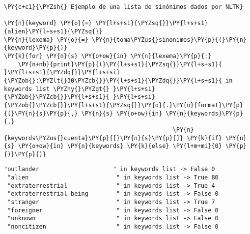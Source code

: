     \begin{tcolorbox}[breakable, size=fbox, boxrule=1pt, pad at break*=1mm,colback=cellbackground, colframe=cellborder]
\begin{Verbatim}[commandchars=\\\{\}]
\PY{c+c1}{\PYZsh{} Ejemplo de una lista de sinónimos dados por NLTK}

\PY{n}{keyword} \PY{o}{=} \PY{l+s+s1}{\PYZsq{}}\PY{l+s+s1}{alien}\PY{l+s+s1}{\PYZsq{}}
\PY{n}{lexema} \PY{o}{=} \PY{n}{toma\PYZus{}sinonimos}\PY{p}{(}\PY{n}{keyword}\PY{p}{)}
\PY{k}{for} \PY{n}{s} \PY{o+ow}{in} \PY{n}{lexema}\PY{p}{:}
    \PY{n+nb}{print}\PY{p}{(}\PY{l+s+s1}{\PYZsq{}}\PY{l+s+s1}{ }\PY{l+s+s1}{\PYZdq{}}\PY{l+s+si}{\PYZob{}:\PYZlt{}30\PYZcb{}}\PY{l+s+s1}{\PYZdq{}}\PY{l+s+s1}{ in keywords list \PYZhy{}\PYZgt{} }\PY{l+s+si}{\PYZob{}\PYZcb{}}\PY{l+s+s1}{ }\PY{l+s+si}{\PYZob{}\PYZcb{}}\PY{l+s+s1}{\PYZsq{}}\PY{o}{.}\PY{n}{format}\PY{p}{(}\PY{n}{s}\PY{p}{,} \PY{n}{s} \PY{o+ow}{in} \PY{n}{keywords}\PY{p}{,}
                                                \PY{n}{keywords\PYZus{}cuenta}\PY{p}{[}\PY{n}{s}\PY{p}{]} \PY{k}{if} \PY{n}{s} \PY{o+ow}{in} \PY{n}{keywords} \PY{k}{else} \PY{l+m+mi}{0} \PY{p}{)}\PY{p}{)}
\end{Verbatim}
\end{tcolorbox}

    \begin{Verbatim}[commandchars=\\\{\}]
 "outlander                     " in keywords list -> False 0
 "alien                         " in keywords list -> True 80
 "extraterrestrial              " in keywords list -> True 4
 "extraterrestrial being        " in keywords list -> False 0
 "stranger                      " in keywords list -> True 7
 "foreigner                     " in keywords list -> False 0
 "unknown                       " in keywords list -> False 0
 "noncitizen                    " in keywords list -> False 0
    \end{Verbatim}

